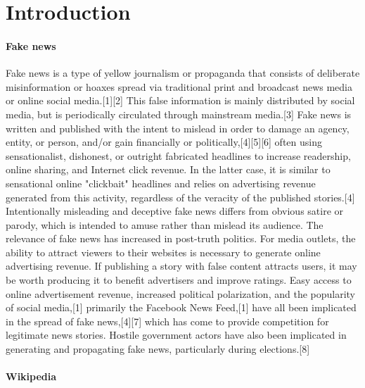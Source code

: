 \documentclass[a4paper, 11pt]{article}
\begin{document}
\section{Introduction}
\frenchspacing
\paragraph{Fake news}\mbox{}

Fake news is a type of yellow journalism or propaganda that consists of deliberate misinformation or hoaxes spread via traditional print and broadcast news media or online social media.[1][2] This false information is mainly distributed by social media, but is periodically circulated through mainstream media.[3] Fake news is written and published with the intent to mislead in order to damage an agency, entity, or person, and/or gain financially or politically,[4][5][6] often using sensationalist, dishonest, or outright fabricated headlines to increase readership, online sharing, and Internet click revenue. In the latter case, it is similar to sensational online "clickbait" headlines and relies on advertising revenue generated from this activity, regardless of the veracity of the published stories.[4] Intentionally misleading and deceptive fake news differs from obvious satire or parody, which is intended to amuse rather than mislead its audience.
The relevance of fake news has increased in post-truth politics. For media outlets, the ability to attract viewers to their websites is necessary to generate online advertising revenue. If publishing a story with false content attracts users, it may be worth producing it to benefit advertisers and improve ratings. Easy access to online advertisement revenue, increased political polarization, and the popularity of social media,[1] primarily the Facebook News Feed,[1] have all been implicated in the spread of fake news,[4][7] which has come to provide competition for legitimate news stories. Hostile government actors have also been implicated in generating and propagating fake news, particularly during elections.[8]

\paragraph{Wikipedia}\mbox{}
\end{document}
